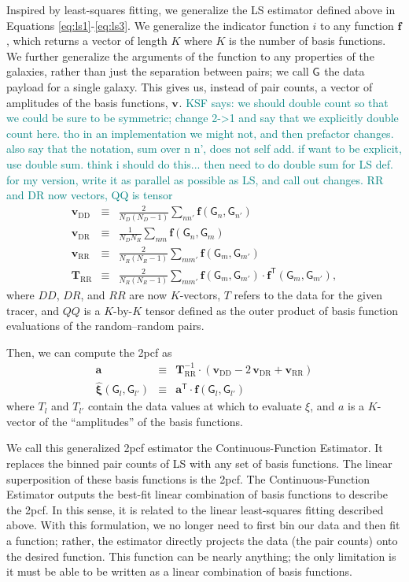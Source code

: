\documentclass[modern]{aastex62}
\newcommand{\cf}{2pcf\xspace} %
\newcommand{\Est}{The Continuous-Function Estimator\xspace}
\newcommand{\est}{the Continuous-Function Estimator\xspace}
\newcommand{\LS}{LS\xspace}
\newcommand{\inv}{^{-1}}
\newcommand{\T}{^{\mathsf{T}}}
\newcommand{\bld}[1]{\bm{#1}} %
\newcommand{\vv}[1]{\bld{v}_\mathrm{#1}}
\newcommand{\TT}[1]{\bld{T}_\mathrm{#1}}
\newcommand{\ff}{\bld{f}}
\newcommand{\GG}[1]{\mathsf{G}_{#1}}
\newcommand{\KSF}[1]{\textcolor{teal}{KSF says: #1}}
\begin{document}
Inspired by least-squares fitting, we generalize the \LS estimator defined above in Equations \ref{eq:ls1}-\ref{eq:ls3}.
We generalize the indicator function $i$ to any function $\ff$, which returns a vector of length $K$ where $K$ is the number of basis functions.
We further generalize the arguments of the function to any properties of the galaxies, rather than just the separation between pairs; we call $\GG{}$ the data payload for a single galaxy.
This gives us, instead of pair counts, a vector of amplitudes of the basis functions, $\vv{}$.
\KSF{we should double count so that we could be sure to be symmetric; change 2->1 and say that we explicitly double count here. tho in an implementation we might not, and then prefactor changes. also say that the notation, sum over n n', does not self add. if want to be explicit, use double sum. think i should do this... then need to do double sum for LS def. for my version, write it as parallel as possible as LS, and call out changes. RR and DR now vectors, QQ is tensor}
\begin{eqnarray}\displaystyle
\vv{DD} &\equiv& \frac{2}{N_D(N_D-1)} \sum_{n n'} \ff(\GG{n}, \GG{n'}) \\
\vv{DR} &\equiv& \frac{1}{N_D N_R} \sum_{n m} \ff(\GG{n}, \GG{m}) \\
\vv{RR} &\equiv& \frac{2}{N_R(N_R-1)} \sum_{m m'} \ff(\GG{m}, \GG{m'}) \\
\TT{RR} &\equiv& \frac{2}{N_R(N_R-1)} \sum_{m m'} \ff(\GG{m}, \GG{m'}) \cdot \ff\T(\GG{m}, \GG{m'}), \label{eq:qq_proj}
\end{eqnarray}
where $DD$, $DR$, and $RR$ are now $K$-vectors, $T$ refers to the data for the given tracer, and $QQ$ is a $K$-by-$K$ tensor defined as the outer product of basis function evaluations of the random--random pairs.

Then, we can compute the \cf as
\begin{eqnarray}\displaystyle
\bld{a} &\equiv& \TT{RR}\inv \cdot (\vv{DD} - 2\,\vv{DR} + \vv{RR}) \\
\bld{\hat{\xi}}(\GG{l}, \GG{l'})  &\equiv& \bld{a}\T \cdot \ff(\GG{l}, \GG{l'}) \label{eq:xi_proj}
\end{eqnarray}
where $T_l$ and $T_{l'}$ contain the data values at which to evaluate $\xi$, and $a$ is a $K$-vector of the ``amplitudes'' of the basis functions.

We call this generalized \cf estimator \est.
It replaces the binned pair counts of \LS with any set of basis functions. 
The linear superposition of these basis functions is the \cf.
\Est outputs the best-fit linear combination of basis functions to describe the \cf.
In this sense, it is related to the linear least-squares fitting described above.
With this formulation, we no longer need to first bin our data and then fit a function; rather, the estimator directly projects the data (the pair counts) onto the desired function.
This function can be nearly anything; the only limitation is it must be able to be written as a linear combination of basis functions.
\end{document}
